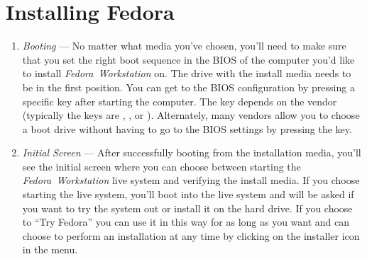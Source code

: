 \section*{Installing Fedora}
\begin{enumerate}
\item\emph{Booting} --- No matter what media you've chosen, you'll need to make sure that you set the right boot sequence in the BIOS of the computer you'd like to install \emph{Fedora~Workstation} on. The drive with the install media needs to be in the first position. You can get to the BIOS configuration by pressing a specific key after starting the computer. The key depends on the vendor (typically the keys are , , or ). Alternately, many vendors allow you to choose a boot drive without having to go to the BIOS settings by pressing the  key.

\item\emph{Initial Screen} --- After successfully booting from the installation media, you'll see the initial screen where you can choose between starting the \emph{Fedora~Workstation} live system and verifying the install media. If you choose starting the live system, you'll boot into the live system and will be asked if you want to try the system out or install it on the hard drive. If you choose to \enquote{Try Fedora} you can use it in this way for as long as you want and can choose to perform an installation at any time by clicking on the installer icon in the menu.


\end{enumerate}
